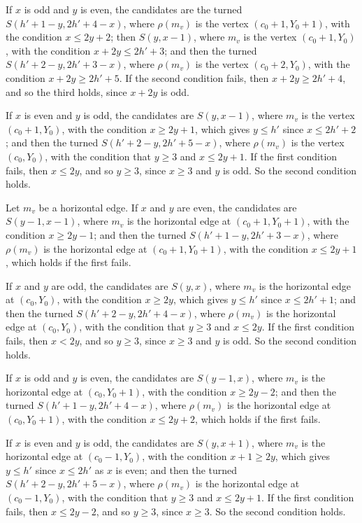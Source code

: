 {If $x$ is odd and $y$ is even, the candidates are the turned $S(h' + 1 - y, 2h' + 4 - x)$, where $\rho(m_v)$ is the vertex $(c_0 + 1, Y_0 + 1)$, with the condition $x \le 2y + 2$; then $S(y, x - 1)$, where $m_v$ is the vertex $(c_0 + 1, Y_0)$, with the condition $x + 2y \le 2h' + 3$; and then the turned $S(h' + 2 - y, 2h' + 3 - x)$, where $\rho(m_v)$ is the vertex $(c_0 + 2, Y_0)$, with the condition $x + 2y \ge 2h' + 5$. If the second condition fails, then $x + 2y \ge 2h' + 4$, and so the third holds, since $x + 2y$ is odd.

If $x$ is even and $y$ is odd, the candidates are $S(y, x - 1)$, where $m_v$ is the vertex $(c_0 + 1, Y_0)$, with the condition $x \ge 2y + 1$, which gives $y \le h'$ since $x \le 2h' + 2$; and then the turned $S(h' + 2 - y, 2h' + 5 - x)$, where $\rho(m_v)$ is the vertex $(c_0, Y_0)$, with the condition that $y \ge 3$ and $x \le 2y + 1$. If the first condition fails, then $x \le 2y$, and so $y \ge 3$, since $x \ge 3$ and $y$ is odd. So the second condition holds.

Let $m_v$ be a horizontal edge. If $x$ and $y$ are even, the candidates are $S(y - 1, x - 1)$, where $m_v$ is the horizontal edge at $(c_0 + 1, Y_0 + 1)$, with the condition $x \ge 2y - 1$; and then the turned $S(h' + 1 - y, 2h' + 3 - x)$, where $\rho(m_v)$ is the horizontal edge at $(c_0 + 1, Y_0 + 1)$, with the condition $x \le 2y + 1$, which holds if the first fails.

If $x$ and $y$ are odd, the candidates are $S(y, x)$, where $m_v$ is the horizontal edge at $(c_0, Y_0)$, with the condition $x \ge 2y$, which gives $y \le h'$ since $x \le 2h' + 1$; and then the turned $S(h' + 2 - y, 2h' + 4 - x)$, where $\rho(m_v)$ is the horizontal edge at $(c_0, Y_0)$, with the condition that $y \ge 3$ and $x \le 2y$. If the first condition fails, then $x < 2y$, and so $y \ge 3$, since $x \ge 3$ and $y$ is odd. So the second condition holds.

If $x$ is odd and $y$ is even, the candidates are $S(y - 1, x)$, where $m_v$ is the horizontal edge at $(c_0, Y_0 + 1)$, with the condition $x \ge 2y - 2$; and then the turned $S(h' + 1 - y, 2h' + 4 - x)$, where $\rho(m_v)$ is the horizontal edge at $(c_0, Y_0 + 1)$, with the condition $x \le 2y + 2$, which holds if the first fails.

If $x$ is even and $y$ is odd, the candidates are $S(y, x + 1)$, where $m_v$ is the horizontal edge at $(c_0 - 1, Y_0)$, with the condition $x + 1 \ge 2y$, which gives $y \le h'$ since $x \le 2h'$ as $x$ is even; and then the turned $S(h' + 2 - y, 2h' + 5 - x)$, where $\rho(m_v)$ is the horizontal edge at $(c_0 - 1, Y_0)$, with the condition that $y \ge 3$ and $x \le 2y + 1$. If the first condition fails, then $x \le 2y - 2$, and so $y \ge 3$, since $x \ge 3$. So the second condition holds.

}
